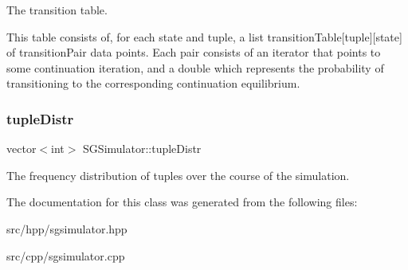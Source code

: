 The transition table. 

This table consists of, for each state and tuple, a list transition\+Table\mbox{[}tuple\mbox{]}\mbox{[}state\mbox{]} of transition\+Pair data points. Each pair consists of an iterator that points to some continuation iteration, and a double which represents the probability of transitioning to the corresponding continuation equilibrium. \mbox{\label{classSGSimulator_a36305f5ab359925508878fc86e2ba2fa}} 
\subsubsection{\texorpdfstring{tuple\+Distr}{tupleDistr}}
{\footnotesize\ttfamily vector$<$int$>$ S\+G\+Simulator\+::tuple\+Distr\hspace{0.3cm}{\ttfamily [private]}}

The frequency distribution of tuples over the course of the simulation. 

The documentation for this class was generated from the following files\+:\begin{DoxyCompactItemize}
\item 
src/hpp/sgsimulator.\+hpp\item 
src/cpp/sgsimulator.\+cpp\end{DoxyCompactItemize}
